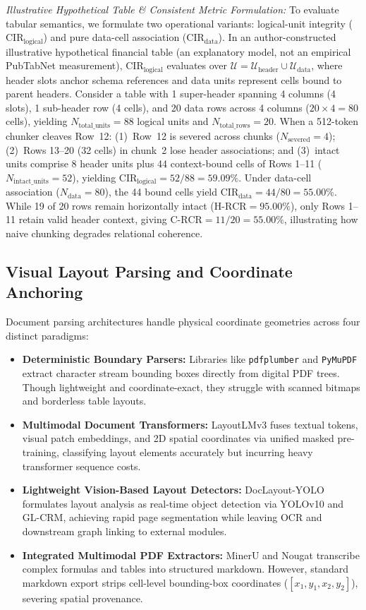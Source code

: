\documentclass[conference,a4paper]{IEEEtran}
\begin{document}
\emph{Illustrative Hypothetical Table \& Consistent Metric Formulation:} To evaluate tabular semantics, we formulate two operational variants: logical-unit integrity ($\text{CIR}_{\text{logical}}$) and pure data-cell association ($\text{CIR}_{\text{data}}$). In an author-constructed illustrative hypothetical financial table (an explanatory model, not an empirical PubTabNet measurement), $\text{CIR}_{\text{logical}}$ evaluates over $\mathcal{U} = \mathcal{U}_{\text{header}} \cup \mathcal{U}_{\text{data}}$, where header slots anchor schema references and data units represent cells bound to parent headers. Consider a table with 1 super-header spanning 4 columns (4 slots), 1 sub-header row (4 cells), and 20 data rows across 4 columns ($20 \times 4 = 80$ cells), yielding $N_{\text{total\_units}} = 88$ logical units and $N_{\text{total\_rows}} = 20$. When a 512-token chunker cleaves Row~12: (1)~Row~12 is severed across chunks ($N_{\text{severed}} = 4$); (2)~Rows 13--20 (32 cells) in chunk~2 lose header associations; and (3)~intact units comprise 8 header units plus 44 context-bound cells of Rows 1--11 ($N_{\text{intact\_units}} = 52$), yielding $\text{CIR}_{\text{logical}} = 52/88 = 59.09\%$. Under data-cell association ($N_{\text{data}} = 80$), the 44 bound cells yield $\text{CIR}_{\text{data}} = 44/80 = 55.00\%$. While 19 of 20 rows remain horizontally intact ($\text{H-RCR} = 95.00\%$), only Rows 1--11 retain valid header context, giving $\text{C-RCR} = 11/20 = 55.00\%$, illustrating how naive chunking degrades relational coherence.

\subsection{Visual Layout Parsing and Coordinate Anchoring}
Document parsing architectures handle physical coordinate geometries across four distinct paradigms:
\begin{itemize}
    \item \textbf{Deterministic Boundary Parsers:} Libraries like \texttt{pdfplumber} and \texttt{PyMuPDF} extract character stream bounding boxes directly from digital PDF trees. Though lightweight and coordinate-exact, they struggle with scanned bitmaps and borderless table layouts.
    \item \textbf{Multimodal Document Transformers:} LayoutLMv3 \cite{huang2022} fuses textual tokens, visual patch embeddings, and 2D spatial coordinates via unified masked pre-training, classifying layout elements accurately but incurring heavy transformer sequence costs.
    \item \textbf{Lightweight Vision-Based Layout Detectors:} DocLayout-YOLO \cite{zhao2024doclayout} formulates layout analysis as real-time object detection via YOLOv10 and GL-CRM, achieving rapid page segmentation while leaving OCR and downstream graph linking to external modules.
    \item \textbf{Integrated Multimodal PDF Extractors:} MinerU \cite{wang2024mineru} and Nougat \cite{blecher2023nougat} transcribe complex formulas and tables into structured markdown. However, standard markdown export strips cell-level bounding-box coordinates ($[x_1, y_1, x_2, y_2]$), severing spatial provenance.
\end{itemize}
\end{document}
